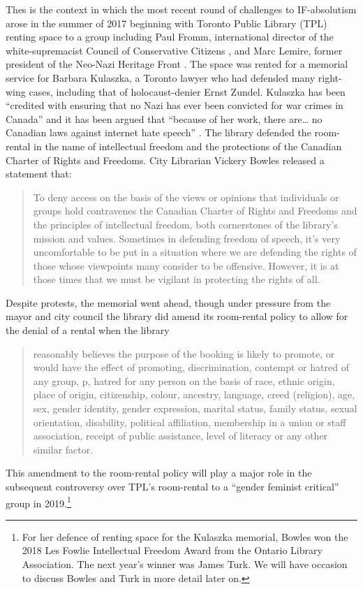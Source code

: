 \documentclass[12pt,oneside]{memoir}
\begin{document}
Thes is the context in which the most recent round of challenges to IF-absolutism arose in the summer of 2017 beginning with Toronto Public Library (TPL) renting space to a group including  Paul Fromm, international director of the white-supremacist Council of Conservative Citizens \cite{quan-2015}, and Marc Lemire, former president of the Neo-Nazi Heritage Front \cite{craggs-2019}. The space was rented for a memorial service for Barbara Kulaszka, a Toronto lawyer who had defended many right-wing cases, including that of holocaust-denier Ernst Zundel.  Kulaszka has been ``credited with ensuring that no Nazi has ever been convicted for war crimes in Canada'' and it has been argued that ``because of her work, there are{\ldots} no Canadian laws against internet hate speech'' \cite{shakeri-2017}. The library defended the room-rental in the name of intellectual freedom and the protections of the Canadian Charter of Rights and Freedoms. City Librarian Vickery Bowles released a statement that: 
\begin{quote}
To deny access on the basis of the views or opinions that individuals or groups hold contravenes the Canadian Charter of Rights and Freedoms and the principles of intellectual freedom, both cornerstones of the library's mission and values. Sometimes in defending freedom of speech, it's very uncomfortable to be put in a situation where we are defending the rights of those whose viewpoints many consider to be offensive. However, it is at those times that we must be vigilant in protecting the rights of all. \cite{tpl-kulaszka}
\end{quote}

 Despite protests, the memorial went ahead, though under pressure from the mayor and city council the library did amend its room-rental policy to allow for the denial of a rental when the library 
\begin{quote}
reasonably believes the purpose of the booking is likely to promote, or would have the effect of promoting, discrimination, contempt or hatred of any group, p, hatred for any person on the basis of race, ethnic origin, place of origin, citizenship, colour, ancestry, language, creed (religion), age, sex, gender identity, gender expression, marital status, family status, sexual orientation, disability, political affiliation, membership in a union or staff association, receipt of public assistance, level of literacy or any other similar factor. \cite{tpl-revisions}
\end{quote}

This amendment to the room-rental policy will play a major role in the subsequent controversy over TPL's room-rental to a ``gender feminist critical'' group in 2019.\footnote{For her defence of renting space for the Kulaszka memorial, Bowles won the 2018 Les Fowlie Intellectual Freedom Award from the Ontario Library Association. The next year's winner was James Turk. We will have occasion to discuss Bowles and Turk in more detail later on.} 
\end{document}
